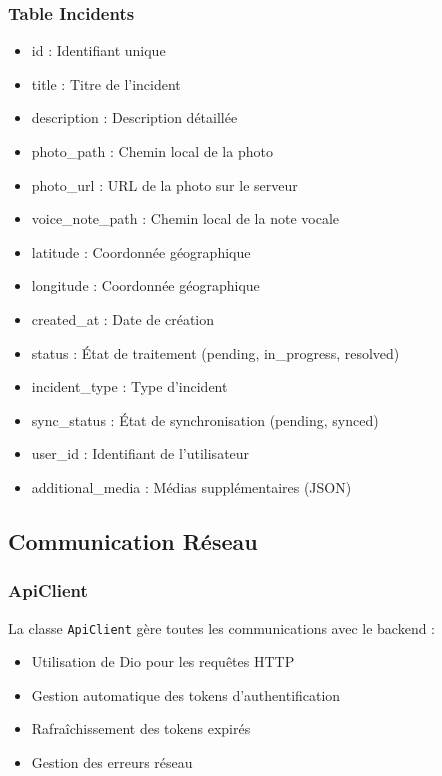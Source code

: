 \documentclass[12pt,a4paper]{article}
\begin{document}
\subsubsection{Table Incidents}
\begin{itemize}
    \item id : Identifiant unique
    \item title : Titre de l'incident
    \item description : Description détaillée
    \item photo\_path : Chemin local de la photo
    \item photo\_url : URL de la photo sur le serveur
    \item voice\_note\_path : Chemin local de la note vocale
    \item latitude : Coordonnée géographique
    \item longitude : Coordonnée géographique
    \item created\_at : Date de création
    \item status : État de traitement (pending, in\_progress, resolved)
    \item incident\_type : Type d'incident
    \item sync\_status : État de synchronisation (pending, synced)
    \item user\_id : Identifiant de l'utilisateur
    \item additional\_media : Médias supplémentaires (JSON)
\end{itemize}

\subsection{Communication Réseau}

\subsubsection{ApiClient}
La classe \texttt{ApiClient} gère toutes les communications avec le backend :
\begin{itemize}
    \item Utilisation de Dio pour les requêtes HTTP
    \item Gestion automatique des tokens d'authentification
    \item Rafraîchissement des tokens expirés
    \item Gestion des erreurs réseau
\end{itemize}
\end{document}
